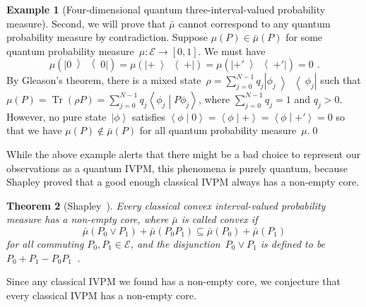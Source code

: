 \documentclass[english,reprint, aps, prl,superscriptaddress, showpacs,
showkeys, longbibliography]{revtex4-1}
\theoremstyle{plain}
\newtheorem{thm}{Theorem}
\theoremstyle{definition}
\newtheorem{example}[thm]{Example}
\newcommand{\events}{\ensuremath{\mathcal{E}}}
\newcommand{\ket}[1]{{\left\vert{#1}\right\rangle}}
\newcommand{\op}[2]{\ensuremath{\left\vert{#1}\middle\rangle\middle\langle{#2}\right\vert}}
\newcommand{\proj}[1]{\op{#1}{#1}}
\newcommand{\ps}{\texttt{+}}
\newcommand{\ip}[2]{\ensuremath{\left\langle{#1}\middle\vert{#2}\right\rangle}}
\newcommand{\Tr}{\mathop{\mathrm{Tr}}\nolimits}
\begin{document}
\begin{example}[Four-dimensional quantum three-interval-valued probability
measure]
Second, we will prove that $\bar{\mu}$ cannot correspond to any quantum
probability measure by contradiction. Suppose $\mu(P)\in\bar{\mu}(P)$
for some quantum probability measure~$\mu:\events\rightarrow\left[0,1\right]$.
We must have 
\begin{equation}
\mu(\proj{0})=\mu(\proj{\ps})=\mu(\proj{\ps'})=0\textrm{ .}\label{eq:probability-zero-on-states}
\end{equation}
By Gleason's theorem, there is a mixed state~$\rho=\sum_{j=0}^{N-1}q_{j}\proj{\phi_{j}}$
such that $\mu\left(P\right)=\Tr\left(\rho P\right)=\sum_{j=0}^{N-1}q_{j}\ip{\phi_{j}}{P\phi_{j}}$,
where $\sum_{j=0}^{N-1}q_{j}=1$ and $q_{j}>0$. However, no pure
state~$\ket{\phi}$ satisfies $\ip{\phi}{0}=\ip{\phi}{\ps}=\ip{\phi}{\ps'}=0$
so that we have $\mu(P)\notin\bar{\mu}(P)$ for all quantum probability
measure~$\mu$.\qed\end{example}

While the above example alerts that there might be a bad choice to
represent our observations as a quantum IVPM, this phenomena is purely
quantum, because Shapley proved that a good enough classical IVPM
always has a non-empty core.

\begin{thm}[Shapley~\cite{Shapley1971,Grabisch2016}]\label{thm:Shapley}Every
classical convex interval-valued probability measure has a non-empty
core, where $\bar{\mu}$ is called convex if 
\begin{equation}
\bar{\mu}\left(P_{0}\vee P_{1}\right)+\bar{\mu}\left(P_{0}P_{1}\right)\subseteq\bar{\mu}\left(P_{0}\right)+\bar{\mu}\left(P_{1}\right)\label{eq:QuantumInterval-valuedProbability-Convex}
\end{equation}
for all commuting $P_{0},P_{1}\in\events$, and the \emph{disjunction}~$P_{0}\vee P_{1}$
is defined to be $P_{0}+P_{1}-P_{0}P_{1}$~\cite{Griffiths2003}.\end{thm}

Since any classical IVPM we found has a non-empty core, we conjecture
that every classical IVPM has a non-empty core.


\end{document}
